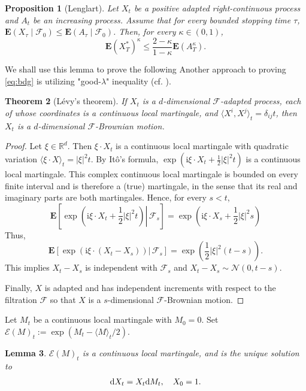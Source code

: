 \documentclass[twoside, 12pt]{book}
\numberwithin{equation}{chapter}
\newtheorem{theorem}{Theorem}[section]
\newtheorem{lemma}[theorem]{Lemma}
\newtheorem{proposition}[theorem]{Proposition}
\def\cF{{\mathcal F}}
\def\cN{{\mathcal N}}
\def\mR{{\mathbb R}}
\def\bE{{\mathbf E}}
\def\sE{{\mathscr E}}
\def\sF{{\mathscr F}}
\def\<{\langle}
\def\>{\rangle}
\def\leq{\leqslant}
\def\d{\text{\rm{d}}}
\def\i{\mathrm{i}}
\begin{document}
	\begin{proposition}[Lenglart]
		 Let $X_t$ be a positive adapted right-continuous process and $A_t$ be an increasing process. Assume that for every bounded stopping time $\tau$, $\mathbf{E} (X_\tau \mid \mathcal{F}_0 ) \leq \mathbf{E} (A_\tau \mid \mathcal{F}_0 )$. Then, for every $\kappa \in (0,1)$, 
		 $$
		     \mathbf{E} \left(X_T^* \right)^\kappa  \leq \frac{2-\kappa}{1-\kappa} \mathbf{E} \left( A_T^\kappa\right).
		 $$
	\end{proposition}
	
	We shall use this lemma to prove the following
	Another approach to proving \eqref{eq:bdg} is utilizing  "good-$\lambda$" inequality (cf. \cite{revuz2013continuous}).   
	\begin{theorem}[L\'evy's theorem]\label{thm:levy}
		If $X_t$ is a $d$-dimensional $\sF$-adapted process, each of whose coordinates is a continuous local martingale, and $\langle X^i, X^j \rangle_t=\delta_{ij} t$, then $X_t$ is a $d$-dimensional $\sF$-Brownian motion.
	\end{theorem}
	\begin{proof}
		Let $\xi\in \mR^d$. Then $\xi\cdot X_t$ is a continuous local martingale with quadratic variation $\<\xi\cdot X\>_t= |\xi|^2 t$. By It\^o's formula, $\exp(\i\xi\cdot X_t+\frac{1}{2}|\xi|^2 t)$ is a continuous local martingale. This complex continuous local martingale is bounded on every finite interval and is therefore a (true) martingale, in the sense that its real and imaginary parts are
		both martingales. Hence, for every $s<t$, 
		$$
		    \bE\left[\left.\exp \left(\mathrm{i} \xi \cdot X_t+\frac{1}{2}|\xi|^2 t\right) \right\rvert\, {\cF}_s\right]=\exp \left(\mathrm{i} \xi \cdot X_s+\frac{1}{2}|\xi|^2 s\right)
		$$
		Thus, 
		$$
		    \bE\left[\left.\exp \left(\mathrm{i} \xi \cdot (X_t-X_s)\right) \right\rvert\, {\cF}_s\right]=\exp \left(\frac{1}{2}|\xi|^2 (t-s)\right). 
		$$
		This implies $X_t-X_s$ is independent with $\cF_s$ and $X_t-X_s\sim \cN(0, t-s)$. 
		
		Finally, $X$ is adapted and has independent
		increments with respect to the filtration $\sF$ so that $X$ is a $s$-dimensional $\sF$-Brownian motion. 
	\end{proof}
	
	Let $M_t$ be a continuous local martingale with $M_0=0$. Set $\sE(M)_t:= \exp(M_t-\langle M \rangle_t/2)$. 
	\begin{lemma}
		$\sE(M)_t$ is a continuous local martingale, and is the unique solution to 
		$$
		    \d X_t= X_t \d M_t, \quad X_0=1. 
		$$
	\end{lemma}
	
\end{document}
